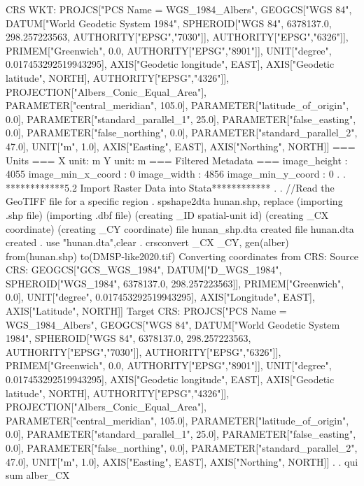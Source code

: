 CRS WKT: PROJCS["PCS Name = WGS_1984_Albers", 
  GEOGCS["WGS 84", 
    DATUM["World Geodetic System 1984", 
      SPHEROID["WGS 84", 6378137.0, 298.257223563, AUTHORITY["EPSG","7030"]], 
      AUTHORITY["EPSG","6326"]], 
    PRIMEM["Greenwich", 0.0, AUTHORITY["EPSG","8901"]], 
    UNIT["degree", 0.017453292519943295], 
    AXIS["Geodetic longitude", EAST], 
    AXIS["Geodetic latitude", NORTH], 
    AUTHORITY["EPSG","4326"]], 
  PROJECTION["Albers_Conic_Equal_Area"], 
  PARAMETER["central_meridian", 105.0], 
  PARAMETER["latitude_of_origin", 0.0], 
  PARAMETER["standard_parallel_1", 25.0], 
  PARAMETER["false_easting", 0.0], 
  PARAMETER["false_northing", 0.0], 
  PARAMETER["standard_parallel_2", 47.0], 
  UNIT["m", 1.0], 
  AXIS["Easting", EAST], 
  AXIS["Northing", NORTH]]
{\smallskip}
=== Units ===
X unit: m
Y unit: m
{\smallskip}
=== Filtered Metadata ===
image_height                : 4055
image_min_x_coord           : 0
image_width                 : 4856
image_min_y_coord           : 0
{\smallskip}
. 
. ************5.2 Import Raster Data into Stata************
. 
. //Read the GeoTIFF file for a specific region
. spshape2dta hunan.shp, replace 
  (importing .shp file)
  (importing .dbf file)
  (creating _ID spatial-unit id)
  (creating _CX coordinate)
  (creating _CY coordinate)
{\smallskip}
  file hunan_shp.dta created
  file hunan.dta     created
{\smallskip}
. use "hunan.dta",clear
{\smallskip}
. crsconvert _CX _CY, gen(alber) from(hunan.shp) to(DMSP-like2020.tif)
Converting coordinates from CRS:
Source CRS: GEOGCS["GCS_WGS_1984", 
  DATUM["D_WGS_1984", 
    SPHEROID["WGS_1984", 6378137.0, 298.257223563]], 
  PRIMEM["Greenwich", 0.0], 
  UNIT["degree", 0.017453292519943295], 
  AXIS["Longitude", EAST], 
  AXIS["Latitude", NORTH]]
Target CRS: PROJCS["PCS Name = WGS_1984_Albers", 
  GEOGCS["WGS 84", 
    DATUM["World Geodetic System 1984", 
      SPHEROID["WGS 84", 6378137.0, 298.257223563, AUTHORITY["EPSG","7030"]], 
      AUTHORITY["EPSG","6326"]], 
    PRIMEM["Greenwich", 0.0, AUTHORITY["EPSG","8901"]], 
    UNIT["degree", 0.017453292519943295], 
    AXIS["Geodetic longitude", EAST], 
    AXIS["Geodetic latitude", NORTH], 
    AUTHORITY["EPSG","4326"]], 
  PROJECTION["Albers_Conic_Equal_Area"], 
  PARAMETER["central_meridian", 105.0], 
  PARAMETER["latitude_of_origin", 0.0], 
  PARAMETER["standard_parallel_1", 25.0], 
  PARAMETER["false_easting", 0.0], 
  PARAMETER["false_northing", 0.0], 
  PARAMETER["standard_parallel_2", 47.0], 
  UNIT["m", 1.0], 
  AXIS["Easting", EAST], 
  AXIS["Northing", NORTH]]
{\smallskip}
. 
. qui sum alber_CX
{\smallskip}
